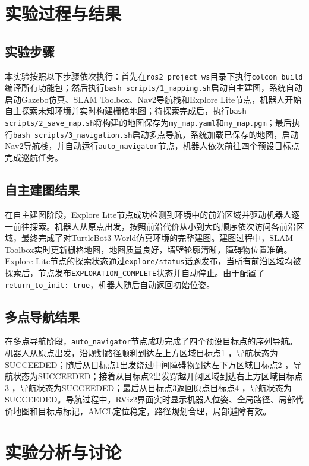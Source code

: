\documentclass[a4paper,12pt]{article}
\begin{document}
\section{实验过程与结果}

\subsection{实验步骤}

本实验按照以下步骤依次执行：首先在\texttt{ros2\_project\_ws}目录下执行\texttt{colcon build}编译所有功能包；然后执行\texttt{bash scripts/1\_mapping.sh}启动自主建图，系统自动启动Gazebo仿真、SLAM Toolbox、Nav2导航栈和Explore Lite节点，机器人开始自主探索未知环境并实时构建栅格地图；待探索完成后，执行\texttt{bash scripts/2\_save\_map.sh}将构建的地图保存为\texttt{my\_map.yaml}和\texttt{my\_map.pgm}；最后执行\texttt{bash scripts/3\_navigation.sh}启动多点导航，系统加载已保存的地图，启动Nav2导航栈，并自动运行\texttt{auto\_navigator}节点，机器人依次前往四个预设目标点完成巡航任务。

\subsection{自主建图结果}

在自主建图阶段，Explore Lite节点成功检测到环境中的前沿区域并驱动机器人逐一前往探索。机器人从原点出发，按照前沿代价从小到大的顺序依次访问各前沿区域，最终完成了对TurtleBot3 World仿真环境的完整建图。建图过程中，SLAM Toolbox实时更新栅格地图，地图质量良好，墙壁轮廓清晰，障碍物位置准确。Explore Lite节点的探索状态通过\texttt{explore/status}话题发布，当所有前沿区域均被探索后，节点发布\texttt{EXPLORATION\_COMPLETE}状态并自动停止。由于配置了\texttt{return\_to\_init: true}，机器人随后自动返回初始位姿。

\subsection{多点导航结果}

在多点导航阶段，\texttt{auto\_navigator}节点成功完成了四个预设目标点的序列导航。机器人从原点出发，沿规划路径顺利到达左上方区域目标点1 ，导航状态为SUCCEEDED；随后从目标点1出发绕过中间障碍物到达左下方区域目标点2 ，导航状态为SUCCEEDED；接着从目标点2出发穿越开阔区域到达右上方区域目标点3 ，导航状态为SUCCEEDED；最后从目标点3返回原点目标点4 ，导航状态为SUCCEEDED。导航过程中，RViz2界面实时显示机器人位姿、全局路径、局部代价地图和目标点标记，AMCL定位稳定，路径规划合理，局部避障有效。

\section{实验分析与讨论}
\end{document}
